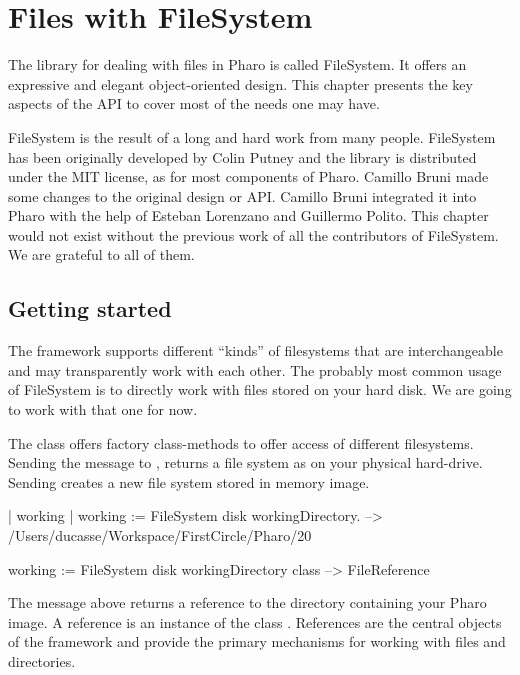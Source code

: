 \documentclass[a4paper,10pt,twoside]{book}
\begin{document}
\fi
\sloppy
\chapter{Files with FileSystem }
\chapterauthor{\authormax}
 
The library for dealing with files in Pharo is called FileSystem. It offers an expressive and elegant object-oriented design.  This chapter presents the key aspects of the API to cover most of the needs one may have.

FileSystem is the result of a long and hard work from many people. FileSystem has been originally developed by Colin Putney and the library is distributed under the MIT license, as for most components of Pharo. Camillo Bruni made some changes to the original design or API. Camillo Bruni integrated it into Pharo with the help of Esteban Lorenzano and Guillermo Polito. This chapter would not exist without the previous work of all the contributors of FileSystem. We are grateful to all of them. 

\section{Getting started}
The framework supports different ``kinds'' of filesystems that are interchangeable and may transparently work with each other. The probably most common usage of FileSystem is to directly work with files stored on your hard disk. We are going to work with that one for now. 

The class  offers factory class-methods to offer access of different filesystems. 
Sending the message  to , returns a file system as on your physical hard-drive. Sending  creates a new file system stored in memory image. 

\begin{code}{}
| working |
working := FileSystem disk workingDirectory.
--> /Users/ducasse/Workspace/FirstCircle/Pharo/20

working := FileSystem disk workingDirectory class 
--> FileReference
\end{code} 

The message  above returns a reference to the directory containing your Pharo image. A reference is an instance of the class . References are the central objects of the framework and provide the primary mechanisms for working with files and directories. 
\end{document}
